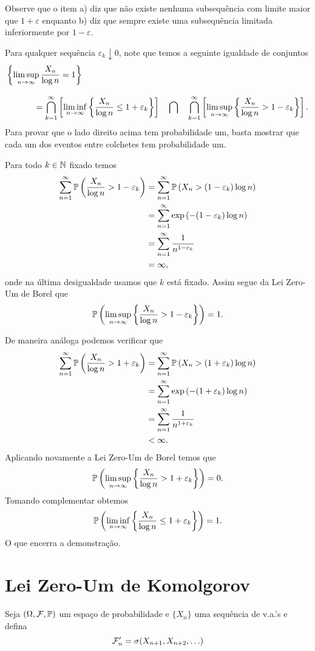 Observe que o item a) diz que não existe nenhuma 
subsequência com limite maior que $1+\varepsilon$ enquanto
b) diz que sempre existe uma subsequência limitada inferiormente
por $1-\varepsilon$. 




Para qualquer sequência $\varepsilon_k\downarrow 0$, 
note que temos a seguinte igualdade
de conjuntos
\begin{align*}
\left\{ \limsup_{n\to\infty} \frac{X_n}{\log n} =1  \right\}
&
\\[0.3cm]
&
\hspace*{-2cm}
=\bigcap_{k=1}^{\infty}
\left[ 
	\liminf_{n\to\infty} 
		\left\{ 
			\frac{X_n}{\log n} \leq 1+\varepsilon_k 
		\right\}  
\right]
\quad
\bigcap
\quad
\bigcap_{k=1}^{\infty}
\left[ 
	\limsup_{n\to\infty} 
		\left\{ 
			\frac{X_n}{\log n} > 1-\varepsilon_k  
		\right\}  
\right].
\end{align*}
%
%
%
%
Para provar que o lado direito acima tem probabilidade
um, basta mostrar que cada um dos eventos 
entre colchetes tem probabilidade um. 

Para todo $k\in\N$ fixado temos 
\begin{align*}
\sum_{n=1}^{\infty} 
\P\left(  
	\frac{X_n}{\log n} > 1-\varepsilon_k 
\right)
&=
\sum_{n=1}^{\infty} 
\P\left(  
	X_n > (1-\varepsilon_k)\log n  
\right)
\\
&=
\sum_{n=1}^{\infty} 
\exp\left(  
	 -(1-\varepsilon_k)\log n  
\right)
\\
&=
\sum_{n=1}^{\infty} 
\frac{1}{n^{1-\varepsilon_k}}
\\
&=
\infty,
\end{align*}
onde na última desigualdade usamos que $k$ 
está fixado. Assim segue da Lei Zero-Um de Borel
que 
	\[
		\P\left( 
			\limsup_{n\to\infty} 
			\left\{ 
				\frac{X_n}{\log n} > 1-\varepsilon_k  
			\right\}  
		\right)
		=
		1.
	\]

De maneira análoga podemos verificar que
\begin{align*}
\sum_{n=1}^{\infty} 
\P\left(  
	\frac{X_n}{\log n} > 1+\varepsilon_k 
\right)
&=
\sum_{n=1}^{\infty} 
\P\left(  
	X_n > (1+\varepsilon_k)\log n  
\right)
\\
&=
\sum_{n=1}^{\infty} 
\exp\left(  
	 -(1+\varepsilon_k)\log n  
\right)
\\
&=
\sum_{n=1}^{\infty} 
\frac{1}{n^{1+\varepsilon_k}}
\\
&<
\infty.
\end{align*}
Aplicando novamente a Lei Zero-Um de Borel
temos que 
	\[
		\P\left( 
			\limsup_{n\to\infty} 
			\left\{ 
				\frac{X_n}{\log n} > 1+\varepsilon_k  
			\right\}  
		\right)
		=
		0.
	\]
Tomando complementar obtemos 
	\[
		\P\left( 
			\liminf_{n\to\infty} 
			\left\{ 
				\frac{X_n}{\log n} \leq 1+\varepsilon_k  
			\right\}  
		\right)
		=1.
	\]
O que encerra a demonstração.















\section{Lei Zero-Um de Komolgorov}

Seja $(\Omega,\F,\P)$ um espaço de probabilidade e 
$\{X_n\}$ uma sequência de v.a.'s e defina
	\[
		\F_n' = \sigma( X_{n+1},X_{n+2},\ldots)
	\] 